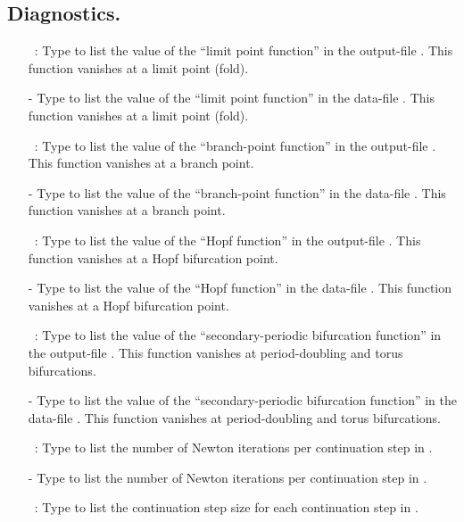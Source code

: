 \subsection{ Diagnostics.} 

\begin{itemize}
\item[\commandf{@lp}]~:
  Type  to list the value of the ``limit point function'' 
  in the output-file . This function
  vanishes at a limit point (fold).
  \item[-]
  Type  to list the value of the ``limit point function'' 
  in the data-file . This function
  vanishes at a limit point (fold).
\item[\commandf{@bp}]~:
  Type  to list the value of the ``branch-point function'' 
  in the output-file . This function
  vanishes at a branch point.
  \item[-]
  Type  to list the value of the ``branch-point function''
  in the data-file . This function
  vanishes at a branch point.
\item[\commandf{@hb}]~:
  Type  to list the value of the ``Hopf function'' 
  in the output-file . This function
  vanishes at a Hopf bifurcation point.
  \item[-]
  Type  to list the value of the ``Hopf function''
  in the data-file . This function
  vanishes at a  Hopf bifurcation point.
\item[\commandf{@sp}]~:
  Type  to list the value of the 
  ``secondary-periodic bifurcation function'' 
  in the output-file . This function
  vanishes at period-doubling and torus bifurcations.
  \item[-]
  Type  to list the value of the
   ``secondary-periodic bifurcation function''
  in the data-file . This function
  vanishes at period-doubling and torus bifurcations.
\item[\commandf{@it}]~:
  Type  to list the number of Newton iterations per
  continuation step in . 
  \item[-]
   Type  to list the number of Newton iterations per
  continuation step in . 
\item[\commandf{@st}]~:
  Type  to list the continuation step size for each
  continuation step in  . 

\end{itemize}
